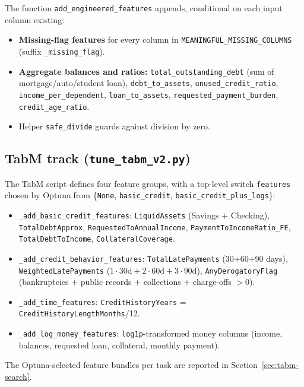 \documentclass[11pt,a4paper]{article}
\begin{document}
The function \texttt{add\_engineered\_features} appends, conditional on each input column existing:

\begin{itemize}[leftmargin=*,nosep]
  \item \textbf{Missing-flag features} for every column in \texttt{MEANINGFUL\_MISSING\_COLUMNS} (suffix \texttt{\_missing\_flag}).
  \item \textbf{Aggregate balances and ratios:} \texttt{total\_outstanding\_debt} (sum of mortgage/auto/student loan), \texttt{debt\_to\_assets}, \texttt{unused\_credit\_ratio}, \texttt{income\_per\_dependent}, \texttt{loan\_to\_assets}, \texttt{requested\_payment\_burden}, \texttt{credit\_age\_ratio}.
  \item Helper \texttt{safe\_divide} guards against division by zero.
\end{itemize}

\subsection{TabM track (\texttt{tune\_tabm\_v2.py})}

The TabM script defines four feature groups, with a top-level switch \texttt{features} chosen by Optuna from \{\texttt{None}, \texttt{basic\_credit}, \texttt{basic\_credit\_plus\_logs}\}:

\begin{itemize}[leftmargin=*,nosep]
  \item \texttt{\_add\_basic\_credit\_features}: \texttt{LiquidAssets} (Savings + Checking), \texttt{TotalDebtApprox}, \texttt{RequestedToAnnualIncome}, \texttt{PaymentToIncomeRatio\_FE}, \texttt{TotalDebtToIncome}, \texttt{CollateralCoverage}.
  \item \texttt{\_add\_credit\_behavior\_features}: \texttt{TotalLatePayments} (30+60+90 days), \texttt{WeightedLatePayments} ($1\!\cdot\!\text{30d} + 2\!\cdot\!\text{60d} + 3\!\cdot\!\text{90d}$), \texttt{AnyDerogatoryFlag} (bankruptcies $+$ public records $+$ collections $+$ charge-offs $> 0$).
  \item \texttt{\_add\_time\_features}: \texttt{CreditHistoryYears} = \texttt{CreditHistoryLengthMonths}/12.
  \item \texttt{\_add\_log\_money\_features}: \texttt{log1p}-transformed money columns (income, balances, requested loan, collateral, monthly payment).
\end{itemize}

The Optuna-selected feature bundles per task are reported in Section~\ref{sec:tabm-search}.
\end{document}
